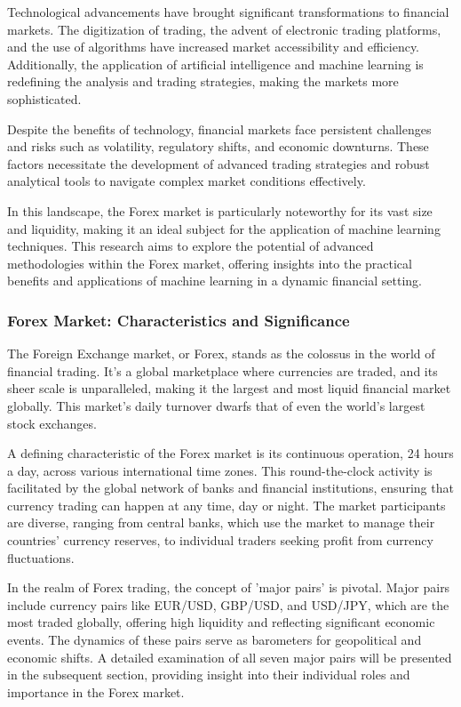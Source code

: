 Technological advancements have brought significant transformations to financial markets. The digitization of trading, the advent of electronic trading platforms, and the use of algorithms have increased market accessibility and efficiency. Additionally, the application of artificial intelligence and machine learning is redefining the analysis and trading strategies, making the markets more sophisticated.

Despite the benefits of technology, financial markets face persistent challenges and risks such as volatility, regulatory shifts, and economic downturns. These factors necessitate the development of advanced trading strategies and robust analytical tools to navigate complex market conditions effectively.

In this landscape, the Forex market is particularly noteworthy for its vast size and liquidity, making it an ideal subject for the application of machine learning techniques. This research aims to explore the potential of advanced methodologies within the Forex market, offering insights into the practical benefits and applications of machine learning in a dynamic financial setting.


\subsubsection{Forex Market: Characteristics and Significance}
The Foreign Exchange market, or Forex, stands as the colossus in the world of financial trading. It's a global marketplace where currencies are traded, and its sheer scale is unparalleled, making it the largest and most liquid financial market globally. This market's daily turnover dwarfs that of even the world’s largest stock exchanges.

A defining characteristic of the Forex market is its continuous operation, 24 hours a day, across various international time zones. This round-the-clock activity is facilitated by the global network of banks and financial institutions, ensuring that currency trading can happen at any time, day or night. The market participants are diverse, ranging from central banks, which use the market to manage their countries' currency reserves, to individual traders seeking profit from currency fluctuations.

In the realm of Forex trading, the concept of 'major pairs' is pivotal. Major pairs include currency pairs like EUR/USD, GBP/USD, and USD/JPY, which are the most traded globally, offering high liquidity and reflecting significant economic events. The dynamics of these pairs serve as barometers for geopolitical and economic shifts. A detailed examination of all seven major pairs will be presented in the subsequent section, providing insight into their individual roles and importance in the Forex market.

